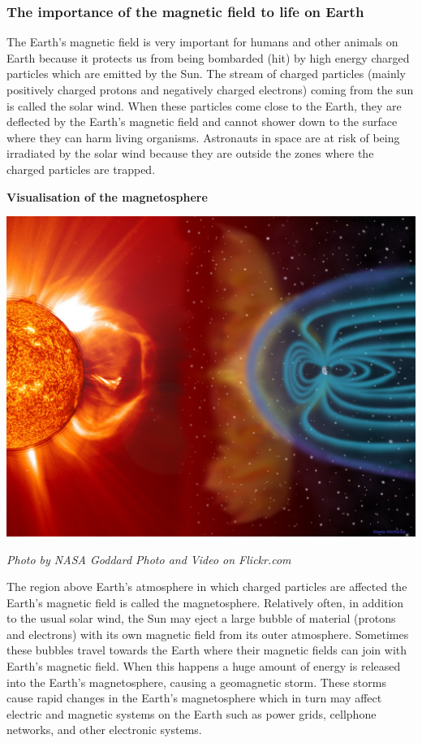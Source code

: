             \subsubsection{The importance of the magnetic field to life on Earth }
            \nopagebreak
\label{m37830*fs-id1166211137674}The Earth's magnetic field is very important for humans and other animals on Earth because it protects us from being bombarded (hit) by high energy charged particles which are emitted by the Sun. The stream of charged particles (mainly positively charged protons and negatively charged electrons) coming from the sun is called the solar wind. When these particles come close to the Earth, they are deflected by the Earth's magnetic field and cannot shower down to the surface where they can harm living organisms. 
Astronauts in space are at risk of being irradiated by the solar wind because they are outside the zones where the charged particles are trapped. 
\par  
\label{m37830*fs-id1166236522828}
\begin{minipage}{.5\textwidth}
 \begin{center}
  \textbf{Visualisation of the magnetosphere}\par
  \includegraphics[width=.8\textwidth]{photos/magnetosphere.jpg}\par
  \textit{Photo by NASA Goddard Photo and Video on Flickr.com}
 \end{center}
\end{minipage}
\begin{minipage}{.5\textwidth}

The region above Earth's atmosphere in which charged particles are affected the Earth's magnetic field is called the magnetosphere. 
Relatively often, in addition to the usual solar wind, the Sun may eject a large bubble of material (protons and electrons) with its own magnetic field from its outer atmosphere. Sometimes these bubbles travel towards the Earth where their magnetic fields can join with Earth's magnetic field. When this happens a huge amount of energy is released into the Earth's magnetosphere, causing a geomagnetic storm. These storms cause rapid changes in the Earth's magnetosphere which in turn may affect electric and magnetic systems on the Earth such as power grids, cellphone networks, and other electronic systems.
\end{minipage}
\par 
\label{m37830*fs-id1166218597625}
